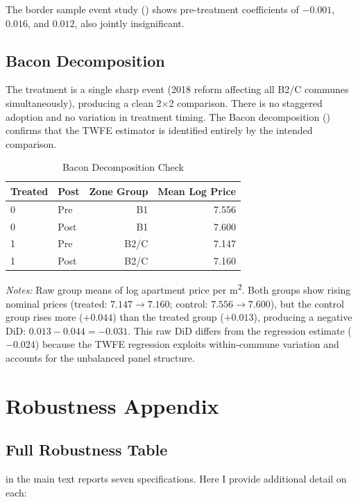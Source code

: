 \documentclass[12pt]{article}
\begin{document}
The border sample event study () shows pre-treatment coefficients of $-0.001$, $0.016$, and $0.012$, also jointly insignificant.

\subsection{Bacon Decomposition}

The treatment is a single sharp event (2018 reform affecting all B2/C communes simultaneously), producing a clean 2$\times$2 comparison. There is no staggered adoption and no variation in treatment timing. The Bacon decomposition () confirms that the TWFE estimator is identified entirely by the intended comparison.

\begin{table}[H]
\centering
\caption{Bacon Decomposition Check}
\label{tab:bacon}
\begin{tabular}{llrr}
\toprule
Treated & Post & Zone Group & Mean Log Price \\
\midrule
0 & Pre & B1 & 7.556 \\
0 & Post & B1 & 7.600 \\
1 & Pre & B2/C & 7.147 \\
1 & Post & B2/C & 7.160 \\
\bottomrule
\end{tabular}
\par\smallskip\noindent\small\textit{Notes:} Raw group means of log apartment price per m\textsuperscript{2}. Both groups show rising nominal prices (treated: $7.147 \to 7.160$; control: $7.556 \to 7.600$), but the control group rises more ($+0.044$) than the treated group ($+0.013$), producing a negative DiD: $0.013 - 0.044 = -0.031$. This raw DiD differs from the regression estimate ($-0.024$) because the TWFE regression exploits within-commune variation and accounts for the unbalanced panel structure.
\end{table}


\section{Robustness Appendix}\label{app:robustness}

\subsection{Full Robustness Table}

 in the main text reports seven specifications. Here I provide additional detail on each:
\end{document}
